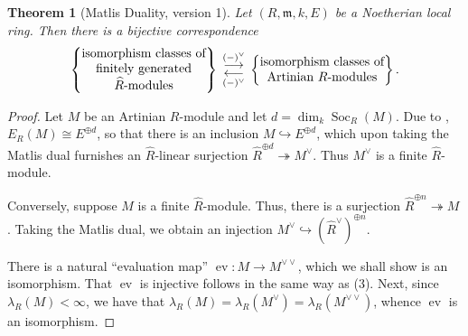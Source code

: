 \documentclass[10pt]{article}
\theoremstyle{thmstyle}
\newtheorem{theorem}{Theorem}[section]
\theoremstyle{defstyle}
\newcommand{\frakm}{\mathfrak{m}} %
\newcommand{\wh}[1]{\widehat{#1}}
\newcommand{\onto}{\twoheadrightarrow}
\newcommand{\into}{\hookrightarrow}
\newcommand{\ev}{\operatorname{ev}}
\newcommand{\Soc}{\operatorname{Soc}}
\begin{document}
\begin{theorem}[Matlis Duality, version 1]
    Let $(R,\frakm,k,E)$ be a Noetherian local ring. Then there is a bijective correspondence 
    \begin{equation*}
        \left\{
        \begin{tabular}{@{} c @{}}
            isomorphism classes of\\
            finitely generated\\ 
            $\wh R$-modules
        \end{tabular}
        \right\}
        \;
        \begin{gathered}
            \overset{(-)^\vee}{\longrightarrow}\\[-2ex]
            \underset{(-)^\vee}{\longleftarrow}
        \end{gathered}
        \;
        \left\{
        \begin{tabular}{@{} c @{}}
            isomorphism classes of\\
            Artinian $R$-modules
        \end{tabular}
        \right\}.
    \end{equation*}
\end{theorem}
\begin{proof}
    Let $M$ be an Artinian $R$-module and let $d = \dim_k\Soc_R(M)$. Due to , $E_R(M)\cong E^{\oplus d}$, so that there is an inclusion $M\into E^{\oplus d}$, which upon taking the Matlis dual furnishes an $\wh R$-linear surjection $\wh R^{\oplus d}\onto M^{\vee}$. Thus $M^{\vee}$ is a finite $\wh R$-module. 

    Conversely, suppose $M$ is a finite $\wh R$-module. Thus, there is a surjection $\wh R^{\oplus n}\onto M$. Taking the Matlis dual, we obtain an injection $M^\vee\into\left(\wh R^\vee\right)^{\oplus n}$.
    
    There is a natural ``evaluation map'' $\ev: M\to M^{\vee\vee}$, which we shall show is an isomorphism. That $\ev$ is injective follows in the same way as  (3). Next, since $\lambda_R(M) < \infty$, we have that $\lambda_R(M) = \lambda_R(M^\vee) = \lambda_R(M^{\vee\vee})$, whence $\ev$ is an isomorphism.
\end{proof}
\end{document}
